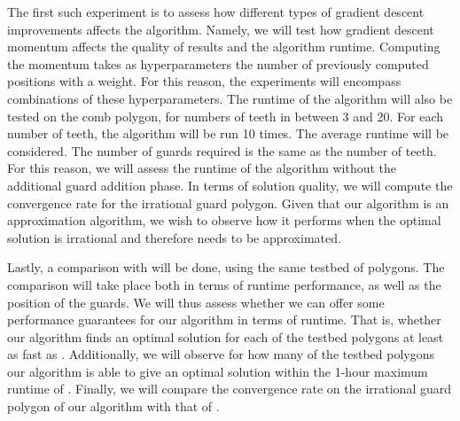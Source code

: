 The first such experiment is to assess how different types of gradient descent improvements affects the algorithm. Namely, we will test how gradient descent momentum \cite{goodfelow2016deep} affects the quality of results and the algorithm runtime. Computing the momentum takes as hyperparameters the number of previously computed positions with a weight. For this reason, the experiments will encompass combinations of these hyperparameters.
The runtime of the algorithm will also be tested on the comb polygon, for  numbers of teeth in between 3 and 20. For each number of teeth, the algorithm will be run 10 times. The average runtime will be considered. The number of guards required is the same as the number of teeth. For this reason, we will assess the runtime of the algorithm without the additional guard addition phase. 
In terms of solution quality, we will compute the convergence rate for the irrational guard polygon. Given that our algorithm is an approximation algorithm, we wish to observe how it performs when the optimal solution is irrational and therefore needs to be approximated.

Lastly, a comparison with \cite{DBLP:journals/corr/abs-2007-06920} will be done, using the same testbed of polygons. The comparison will take place both in terms of runtime performance, as well as the position of the guards. We will thus assess whether we can offer some performance guarantees for our algorithm in terms of runtime. That is, whether our algorithm finds an optimal solution for each of the testbed polygons at least as fast as \cite{DBLP:journals/corr/abs-2007-06920}. Additionally, we will observe for how many of the testbed polygons our algorithm is able to give an optimal solution within the 1-hour maximum runtime of \cite{DBLP:journals/corr/abs-2007-06920}. Finally, we will compare the convergence rate on the irrational guard polygon of our algorithm with that of \cite{DBLP:journals/corr/abs-2007-06920}.



